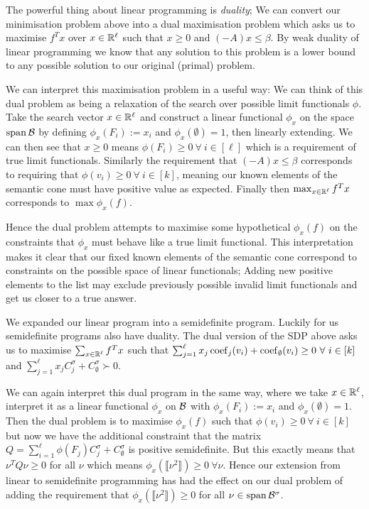 The powerful thing about linear programming is \textit{duality}; We can convert our minimisation
problem above into a dual maximisation problem which asks us to maximise
$f^Tx$ over $x \in \mathbb{R}^\ell$ such that $x \geq 0$ and $(-A)x \leq \beta$.
By weak duality of linear programming
we know that any solution to this problem is a lower bound to any possible solution to
our original (primal) problem.

We can interpret this maximisation problem in a useful way: We can think of this dual
problem as being a relaxation of the search over possible limit functionals $\phi$.
Take the search vector $x\in\mathbb{R}^\ell$ and construct a linear functional $\phi_x$ on the
space $\operatorname{span}\mathcal{B}$ by defining $\phi_x(F_i) := x_i$ and $\phi_x(\emptyset) = 1$, then
linearly extending. We can then see that $x \geq 0$ means $\phi(F_i) \geq 0\ \forall\ i \in[\ell]$
which is a requirement of true limit functionals. Similarly the requirement
that $(-A)x \leq \beta$ corresponds to requiring that $\phi(v_i) \geq 0\ \forall\ i\in[k]$,
meaning our known elements of the semantic cone must have positive value as expected.
Finally then $\max_{x\in\mathbb{R}^\ell} f^Tx$ corresponds to $\max \phi_x(f)$.

Hence the dual problem attempts to maximise some hypothetical $\phi_x(f)$ on the
constraints that $\phi_x$ must behave like a true limit functional. This interpretation
makes it clear that our fixed known elements of the semantic cone correspond to constraints
on the possible space of linear functionals; Adding new positive elements to the list
may exclude previously possible invalid limit functionals and get us closer to a true answer.

We expanded our linear program into a semidefinite program. Luckily for us semidefinite
programs also have duality. The dual version of the SDP above asks us to
maximise $\sum_{x\in\mathbb{R}^\ell}f^Tx$ such that
$\sum_{j=1}^\ell x_j\operatorname{coef}_j(v_i) + \operatorname{coef}_\emptyset(v_i) \geq 0\ \forall\ i\in[k]$ and
$\sum_{j=1}^\ell x_jC_j^\sigma + C_\emptyset^\sigma \succ 0$.

We can again interpret this dual program in the same way, where we take $x\in\mathbb{R}^\ell$,
interpret it as a linear functional $\phi_x$ on $\mathcal{B}$ with $\phi_x(F_i) := x_i$ and
$\phi_x(\emptyset)=1$. Then the dual problem is to maximise $\phi_x(f)$ such that
$\phi(v_i) \geq 0\ \forall\ i\in[k]$ but now we have the additional constraint that
the matrix $Q = \sum_{i=1}^\ell\phi(F_j)C_j^\sigma + C_\emptyset^\sigma$ is positive semidefinite.
But this exactly means that $\nu^T Q \nu \geq 0$ for all $\nu$ which means
$\phi_x(\llbracket \nu^2 \rrbracket) \geq 0\ \forall \nu$. Hence our extension from linear
to semidefinite programming has had the effect on our dual problem of adding the
requirement that $\phi_x(\llbracket \nu^2 \rrbracket) \geq 0$ for all $\nu\in\operatorname{span}\mathcal{B}^\sigma$.

